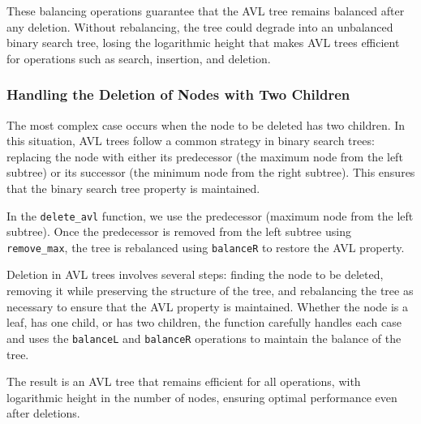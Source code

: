 These balancing operations guarantee that the AVL tree remains balanced after any deletion. Without rebalancing, the tree could degrade into an unbalanced binary search tree, losing the logarithmic height that makes AVL trees efficient for operations such as search, insertion, and deletion.

\subsubsection{Handling the Deletion of Nodes with Two Children}

The most complex case occurs when the node to be deleted has two children. In this situation, AVL trees follow a common strategy in binary search trees: replacing the node with either its predecessor (the maximum node from the left subtree) or its successor (the minimum node from the right subtree). This ensures that the binary search tree property is maintained.

In the \texttt{delete\_avl} function, we use the predecessor (maximum node from the left subtree). Once the predecessor is removed from the left subtree using \texttt{remove\_max}, the tree is rebalanced using \texttt{balanceR} to restore the AVL property.

Deletion in AVL trees involves several steps: finding the node to be deleted, removing it while preserving the structure of the tree, and rebalancing the tree as necessary to ensure that the AVL property is maintained. Whether the node is a leaf, has one child, or has two children, the function carefully handles each case and uses the \texttt{balanceL} and \texttt{balanceR} operations to maintain the balance of the tree.

The result is an AVL tree that remains efficient for all operations, with logarithmic height in the number of nodes, ensuring optimal performance even after deletions.


